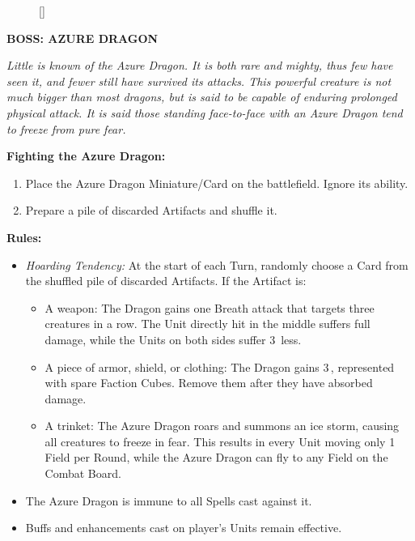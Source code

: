 \begin{figure}
  \raisebox{0pt}[\dimexpr{}\baselineskip\relax]{}
  \vspace*{2\baselineskip}
\end{figure}
{
  \textbf{\MakeUppercase{Boss: Azure Dragon}}

  \medskip

  \textit{Little is known of the Azure Dragon.
    It is both rare and mighty, thus few have seen it, and fewer still have survived its attacks.
    This powerful creature is not much bigger than most dragons, but is said to be capable of enduring prolonged physical attack.
    It is said those standing face-to-face with an Azure Dragon tend to freeze from pure fear.
  }

  \medskip

  \textbf{Fighting the Azure Dragon:}
  \begin{enumerate}
    \item Place the Azure Dragon Miniature/Card on the battlefield.
      Ignore its ability.
    \item Prepare a pile of discarded Artifacts and shuffle it.
  \end{enumerate}

  \medskip

  \textbf{Rules:}
  \begin{itemize}
    \item \textit{Hoarding Tendency:} At the start of each Turn, randomly choose a Card from the shuffled pile of discarded Artifacts.
      If the Artifact is:
      \begin{itemize}
        \item A weapon: The Dragon gains one Breath attack that targets three creatures in a row.
          The Unit directly hit in the middle suffers full damage, while the Units on both sides suffer 3\, less.
        \item A piece of armor, shield, or clothing: The Dragon gains 3\,, represented with spare Faction Cubes.
          Remove them after they have absorbed damage.
        \item A trinket: The Azure Dragon roars and summons an ice storm, causing all creatures to freeze in fear.
          This results in every Unit moving only 1 Field per Round, while the Azure Dragon can fly to any Field on the Combat Board.
      \end{itemize}
    \item The Azure Dragon is immune to all Spells cast against it.
    \item Buffs and enhancements cast on player's Units remain effective.
  \end{itemize}
}

